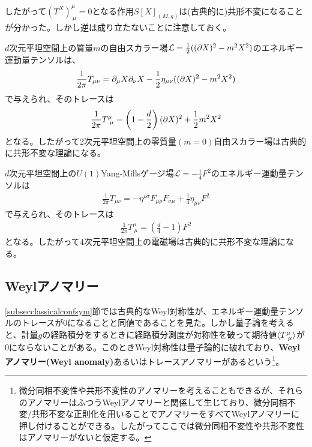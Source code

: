 したがって$(T^X)^{\mu}_{\ \mu}=0$となる作用$S[X]_{(M,g)}$は(古典的に)共形不変になることが分かった。しかし逆は成り立たないことに注意しておく。
\begin{ex}
$d$次元平坦空間上の質量$m$の自由スカラー場$\mathcal{L}=\frac{1}{2}((\partial X)^2-m^2 X^2)$のエネルギー運動量テンソルは、
\begin{align}
\frac{1}{2\pi}T_{\mu\nu}=\partial_\mu X \partial_\nu X-\frac{1}{2}\eta_{\mu\nu}((\partial X)^2-m^2 X^2)
\end{align}
で与えられ、そのトレースは
\begin{align}
\frac{1}{2\pi}T^\mu_{\ \mu}=\left(1-\frac{d}{2}\right)(\partial X)^2+\frac{1}{2}m^2 X^2
\end{align}
となる。したがって2次元平坦空間上の零質量$(m=0)$自由スカラー場は古典的に共形不変な理論になる。
\end{ex}

\begin{ex}
$d$次元平坦空間上の$U(1)$Yang-Millsゲージ場$\mathcal{L}=-\frac{1}{4}F^2$のエネルギー運動量テンソルは
\begin{align}
\frac{1}{2\pi}T_{\mu\nu}=-\eta^{\rho\sigma}F_{\mu\rho}F_{\sigma\mu}+\frac{1}{4}\eta_{\mu\nu}F^2
\end{align}
で与えられ、そのトレースは
\begin{align}
\frac{1}{2\pi}T^{\mu}_{\ \mu}=\left(\frac{d}{4}-1\right)F^2
\end{align}
となる。したがって4次元平坦空間上の電磁場は古典的に共形不変な理論になる。
\end{ex}

\subsection{Weylアノマリー}
\ref{subsecclassicalconfsym}節では古典的なWeyl対称性が、エネルギー運動量テンソルのトレースが$0$になることと同値であることを見た。しかし量子論を考えると、計量$g$の経路積分をするときに経路積分測度が対称性を破って期待値$\la T^{\mu}_{\ \mu}\ra$が$0$にならないことがある。このときWeyl対称性は量子論的に破れており、\textbf{Weylアノマリー(Weyl anomaly)}あるいはトレースアノマリーがあるという\footnote{微分同相不変性や共形不変性のアノマリーを考えることもできるが、それらのアノマリーはふつうWeylアノマリーと関係して生じており、微分同相不変/共形不変な正則化を用いることでアノマリーをすべてWeylアノマリーに押し付けることができる。したがってここでは微分同相不変性や共形不変性はアノマリーがないと仮定する。}。

